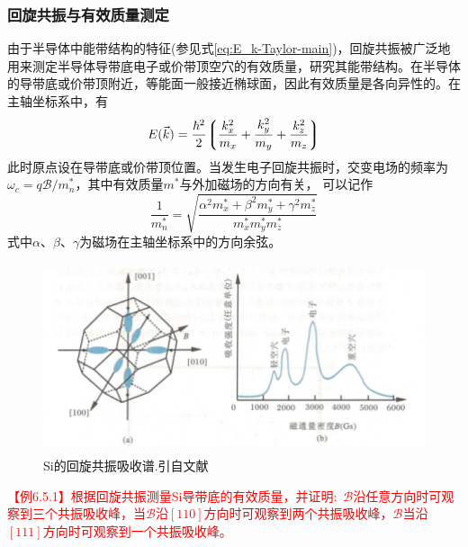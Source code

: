 \subsubsection{回旋共振与有效质量测定} 
由于半导体中能带结构的特征(参见式\eqref{eq:E_k-Taylor-main})，回旋共振被广泛地用来测定半导体导带底电子或价带顶空穴的有效质量，研究其能带结构。在半导体的导带底或价带顶附近，等能面一般接近椭球面，因此有效质量是各向异性的。在主轴坐标系中，有
\begin{equation}
	E(\vec k)=\dfrac{\hbar^2}2\bigg\lgroup\dfrac{k_x^2}{m_x}+\dfrac{k_y^2}{m_y}+\dfrac{k_z^2}{m_z}\bigg\rgroup
	\label{eq:E-effectiver_mass}
\end{equation}
此时原点设在导带底或价带顶位置。当发生电子回旋共振时，交变电场的频率为$\omega_c=q\mathscr{B}/m_n^{\ast}$，其中有效质量$m^{\ast}$与外加磁场的方向有关，%
可以记作
\begin{equation}
	\dfrac1{m_n^{\ast}}=\sqrt{\dfrac{\alpha^2m_x^{\ast}+\beta^2m_y^{\ast}+\gamma^2m_z^{\ast}}{m_x^{\ast}m_y^{\ast}m_z^{\ast}}}
	\label{eq:effective-mass-inverse}
\end{equation}
式中$\alpha$、$\beta$、$\gamma$为磁场在主轴坐标系中的方向余弦。
\begin{figure}[h!]
\centering
\vspace*{-0.10in}
\includegraphics[height=2.20in,width=4.60in,viewport=0 0 105 50,clip]{Figures/Si-Cycicle_Responant.png}
\caption{\small \textrm{Si的回旋共振吸收谱.引自文献}}%
\label{Fig:Si-response-absorption}
\end{figure}

\textcolor{red}{【例6.5.1】根据回旋共振测量Si导带底的有效质量，并证明:~$\mathscr{B}$沿任意方向时可观察到三个共振吸收峰，当$\mathscr{B}$沿$[110]$方向时可观察到两个共振吸收峰，$\mathscr{B}$当沿$[111]$方向时可观察到一个共振吸收峰。}

